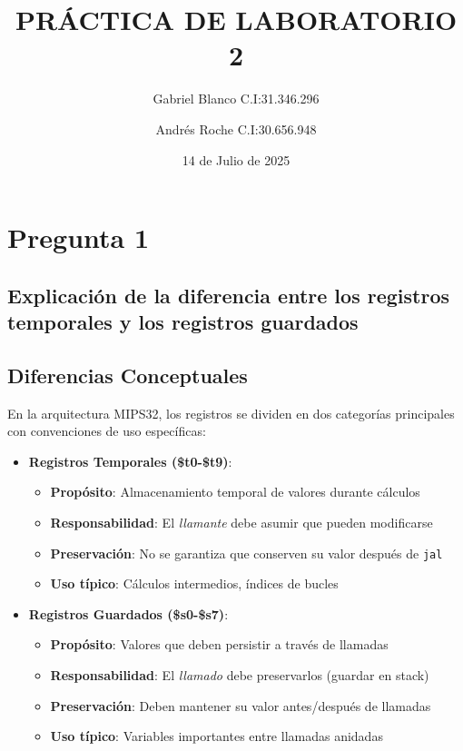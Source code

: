 \documentclass{article}
\title{PRÁCTICA DE LABORATORIO 2}
\author{
    Gabriel Blanco C.I:31.346.296
    \and
    Andrés Roche C.I:30.656.948
}
\date{14 de Julio de 2025} %
\begin{document}
\maketitle


\section*{Pregunta 1}
\subsection*{Explicación de la diferencia entre los registros temporales y los registros guardados}

\subsection*{Diferencias Conceptuales}

En la arquitectura MIPS32, los registros se dividen en dos categorías principales con convenciones de uso específicas:

\begin{itemize}
    \item \textbf{Registros Temporales (\$t0-\$t9)}:
    \begin{itemize}
        \item \textbf{Propósito}: Almacenamiento temporal de valores durante cálculos
        \item \textbf{Responsabilidad}: El \textit{llamante} debe asumir que pueden modificarse
        \item \textbf{Preservación}: No se garantiza que conserven su valor después de \texttt{jal}
        \item \textbf{Uso típico}: Cálculos intermedios, índices de bucles
    \end{itemize}
    
    \item \textbf{Registros Guardados (\$s0-\$s7)}:
    \begin{itemize}
        \item \textbf{Propósito}: Valores que deben persistir a través de llamadas
        \item \textbf{Responsabilidad}: El \textit{llamado} debe preservarlos (guardar en stack)
        \item \textbf{Preservación}: Deben mantener su valor antes/después de llamadas
        \item \textbf{Uso típico}: Variables importantes entre llamadas anidadas
    \end{itemize}
\end{itemize}
\end{document}
